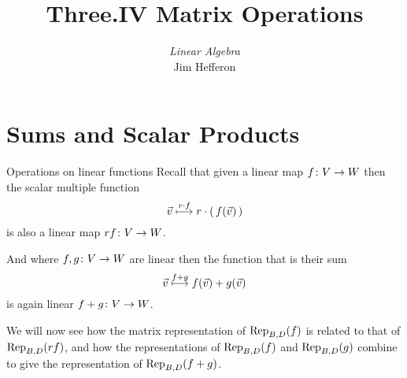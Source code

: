 \documentclass[9pt,t]{beamer}
\title[Matrix Operations] %
{Three.IV Matrix Operations}
\author{\textit{Linear Algebra} \\ {\small Jim Hef{}feron}}
\institute{
  \texttt{http://joshua.smcvt.edu/linearalgebra}
}
\date{}
\begin{document}
\begin{frame}
  \titlepage
\end{frame}




\section{Sums and Scalar Products}
\begin{frame}{Operations on linear functions}
Recall that given 
a linear map $\map{f}{V}{W}$ then 
the scalar multiple function 
\begin{equation*}
  \vec{v}\mapsunder{r\cdot f} r\cdot (\,f(\vec{v})\,)
\end{equation*}
is also a linear map $\map{rf}{V}{W}$.

And where $\map{f,g}{V}{W}$ are 
linear then the function that is their sum 
\begin{equation*}
  \vec{v}\mapsunder{f+g} f(\vec{v})+g(\vec{v})
\end{equation*}
is again linear $\map{f+g}{V}{W}$.

We will now see how the matrix representation of
$\rep{f}{B,D}$ 
is related to that of $\rep{rf}{B,D}$, 
and how the representations of 
$\rep{f}{B,D}$ and $\rep{g}{B,D}$
combine to give the representation of $\rep{f+g}{B,D}$.
\end{frame}
\end{document}
